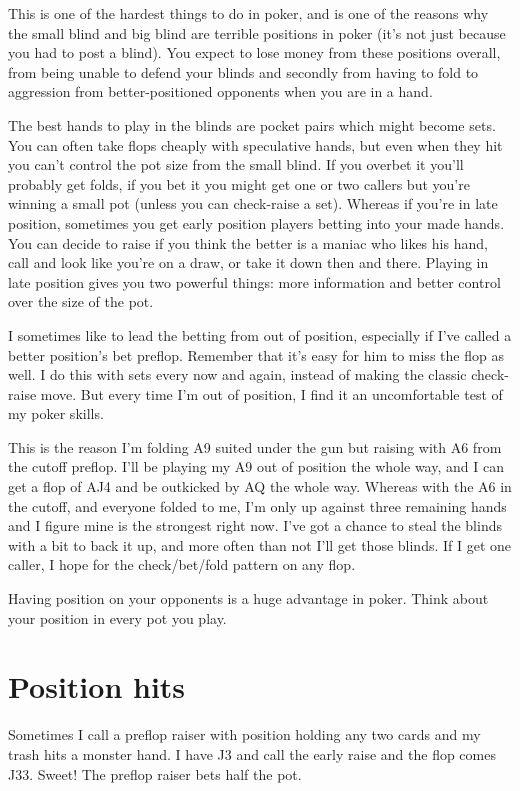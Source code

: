 This is one of the hardest things to do in poker, and is one of
the reasons why the small blind and big blind are
terrible positions in poker (it's not just because you had to post
a blind). You expect to lose money from these
positions overall, from being unable to defend your blinds and secondly
from having to fold to aggression from better-positioned opponents when you
are in a hand.

The best hands to play in the blinds are pocket pairs which might become
sets. You can often take flops cheaply with speculative hands, but even
when they hit you can't control the pot size from the small blind. If you
overbet it you'll probably get folds, if you bet it you might get one or
two callers but you're winning a small pot (unless you can check-raise
a set). Whereas if you're in late position, sometimes you get early
position players betting into your made hands. You can decide to raise
if you think the better is a maniac who likes his hand, call and look
like you're on a draw, or take it down then and there. Playing in late
position gives you two powerful things: more information and better control
over the size of the pot.

I sometimes like to lead the betting from out of position, especially
if I've called a better position's bet preflop. Remember that
it's easy for him to miss the flop as well. I do this
with sets every now and again, instead of making the classic check-raise
move. But every time I'm out of position, I find it an
uncomfortable test of my poker skills.

This is the reason I'm folding A9 suited under the gun but raising
with A6 from the cutoff preflop. I'll be playing my A9 out of position the
whole way, and I can get a flop of AJ4 and be outkicked by AQ the
whole way. Whereas with the A6 in the cutoff, and everyone folded to me,
I'm only up against three remaining hands and I figure mine is
the strongest right now. I've got a chance to steal the blinds with a
bit to back it up, and more often than not I'll get those blinds. If I get
one caller, I hope for the check/bet/fold pattern on any flop.

Having position on your opponents is a huge advantage in poker. Think
about your position in every pot you play.

\section{Position hits}

Sometimes I call a preflop raiser with position holding any two cards
and my trash hits a monster hand. I have J3 and call
the early raise and the flop comes J33. Sweet! The preflop raiser
bets half the pot.

